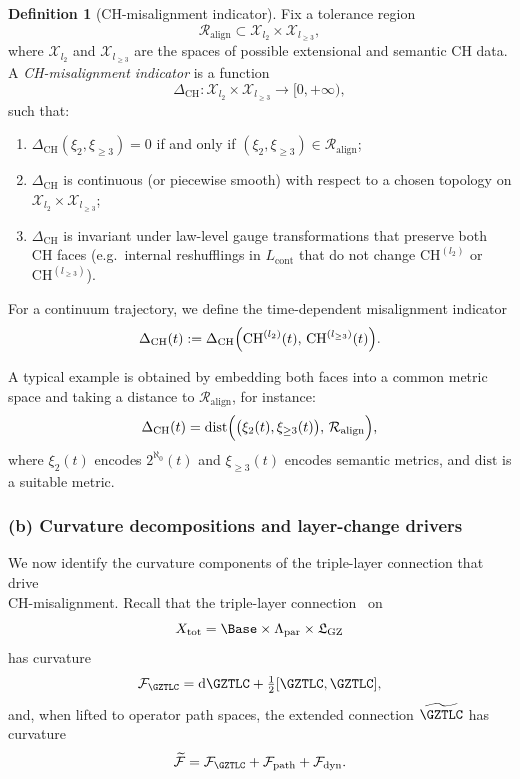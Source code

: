 \documentclass[11pt]{book}
\theoremstyle{plain}
\theoremstyle{definition}
\newtheorem{definition}[theorem]{Definition} \theoremstyle{remark}
\newcommand{\GZLS}{\ensuremath{\mathfrak{L}_{\mathrm{GZ}}}}       \newcommand{\GZLT}{\ensuremath{M_{!w}}}                           \newcommand{\GZLOC}{\ensuremath{A_M}}                             \newcommand{\GZLCurv}{\ensuremath{\mathcal{F}_{\mathrm{law}}}}
\begin{document}
\begin{definition}[CH-misalignment indicator]
Fix a tolerance region
  \[
     \mathcal{R}_{\mathrm{align}}
     \subset
     \mathcal{X}_{l_2}\times\mathcal{X}_{l_{\ge3}},
  \]
  where $\mathcal{X}_{l_2}$ and $\mathcal{X}_{l_{\ge3}}$ are the
  spaces of possible extensional and semantic CH data. A
  \emph{CH-misalignment indicator} is a function
  \[
    \Delta_{\mathrm{CH}}:
      \mathcal{X}_{l_2}\times\mathcal{X}_{l_{\ge3}}
      \longrightarrow [0,+\infty),
  \]
  such that:
  \begin{enumerate}[label=\roman*)]
    \item $\Delta_{\mathrm{CH}}(\xi_2,\xi_{\ge3}) = 0$ if and only if
          $(\xi_2,\xi_{\ge3})\in\mathcal{R}_{\mathrm{align}}$;
    \item $\Delta_{\mathrm{CH}}$ is continuous (or piecewise smooth)
          with respect to a chosen topology on
          $\mathcal{X}_{l_2}\times\mathcal{X}_{l_{\ge3}}$;
    \item $\Delta_{\mathrm{CH}}$ is invariant under law-level gauge
          transformations that preserve both CH faces (e.g.\ internal
          reshufflings in $L_{\mathrm{cont}}$ that do not change
          $\mathrm{CH}^{(l_2)}$ or $\mathrm{CH}^{(l_{\ge3})}$).
  \end{enumerate}
\end{definition}

For a continuum trajectory, we define the time-dependent misalignment
indicator
\[
   \Delta_{\mathrm{CH}}(t)
   :=
   \Delta_{\mathrm{CH}}\Bigl(
     \mathrm{CH}^{(l_2)}(t),\,
     \mathrm{CH}^{(l_{\ge3})}(t)
   \Bigr).
\]

A typical example is obtained by embedding both faces into a common
metric space and taking a distance to $\mathcal{R}_{\mathrm{align}}$,
for instance:
\[
   \Delta_{\mathrm{CH}}(t)
   =
   \mathrm{dist}\Bigl(
     \bigl(\xi_2(t),\xi_{\ge3}(t)\bigr),\,
     \mathcal{R}_{\mathrm{align}}
   \Bigr),
\]
where $\xi_2(t)$ encodes $2^{\aleph_0}(t)$ and $\xi_{\ge3}(t)$ encodes
semantic metrics, and $\mathrm{dist}$ is a suitable metric.



\subsubsection*{(b) Curvature decompositions and layer-change drivers}

We now identify the curvature components of the triple-layer connection that drive \\ CH-misalignment. Recall that the triple-layer connection
\GZTLC\ on
\[
  X_{\mathrm{tot}} = \Base\times\Lambda_{\mathrm{par}}\times\GZLS
\]
has curvature
\[
  \mathcal{F}_{\GZTLC}
  =
  \mathrm{d}\GZTLC + \tfrac12[\GZTLC,\GZTLC],
\]
and, when lifted to operator path spaces, the extended connection
$\widetilde{\GZTLC}$ has curvature
\[
  \widetilde{\mathcal{F}}
  =
  \mathcal{F}_{\GZTLC}
  +\mathcal{F}_{\mathrm{path}}
  +\mathcal{F}_{\mathrm{dyn}}.
\]
\end{document}

